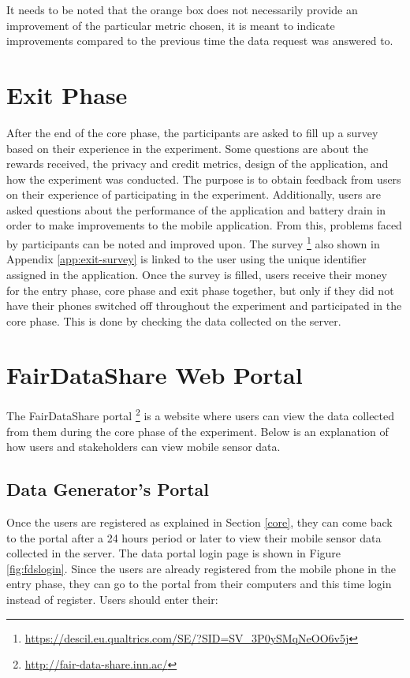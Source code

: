 It needs to be noted that the orange box does not necessarily provide an improvement of the particular metric chosen, it is meant to indicate improvements compared to the previous time the data request was answered to.


\section{Exit Phase}

After the end of the core phase, the participants are asked to fill up a survey based on their experience in the experiment. Some questions are
about the rewards received, the privacy and credit metrics, design of the application, and how the experiment was conducted. The purpose is to obtain feedback from users on their experience of participating in the experiment. Additionally, users are asked questions about the performance of the application and battery drain in order to make improvements to the mobile application. From this, problems faced by participants can be noted and improved upon. The survey \footnote{\url{https://descil.eu.qualtrics.com/SE/?SID=SV_3P0ySMqNeOO6v5j}} also shown in Appendix \ref{app:exit-survey} is linked to the user using the unique identifier assigned in the application. Once the survey is filled, users receive their money for the entry phase, core phase and exit phase together, but only if they did not have their phones switched off throughout the experiment and participated in the core phase. This is done by checking the data collected on the server. 

\section{FairDataShare Web Portal} \label{fds}

The FairDataShare portal \footnote{\url{http://fair-data-share.inn.ac/}} is a website where users can view the data collected from them during the core phase of the experiment. Below is an explanation of how users and stakeholders can view mobile sensor data.

\subsection{Data Generator's Portal}

Once the users are registered as explained in Section \ref{core}, they can come back to the portal after a 24 hours period or later to view their mobile sensor data collected in the server. The data portal login page is shown in Figure \ref{fig:fdslogin}. Since the users are already registered from the mobile phone in the entry phase, they can go to the portal from their computers and this time login instead of register. Users should enter their: 

